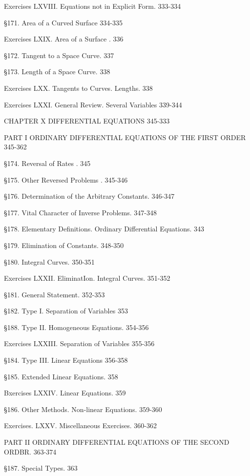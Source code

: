 \documentclass[12pt]{article}
\begin{document}
Exercises LXVIII. Equations not in Explicit Form. 333-334

\S 171. Area of a Curved Surface 334-335

Exercises LXIX. Area of a Surface . 336

\S 172. Tangent to a Space Curve. 337

\S 173. Length of a Space Curve. 338

Exercises LXX. Tangents to Curves. Lengths. 338

Exercises LXXI. General Review. Several Variables 339-344

CHAPTER X DIFFERENTIAL EQUATIONS 345-333
\begin{center}
PART I ORDINARY DIFFERENTIAL EQUATIONS OF
THE FIRST ORDER 345-362
\end{center}

\S 174. Reversal of Rates . 345

\S 175. Other Reversed Problems . 345-346

\S 176. Determination of the Arbitrary Constants. 346-347

\S 177. Vital Character of Inverse Problems. 347-348

\S 178. Elementary Definitions. Ordinary Differential Equations. 343

\S 179. Elimination of Constants. 348-350

\S 180. Integral Curves. 350-351

Exercises LXXII. EliminatIon. Integral Curves. 351-352

\S 181. General Statement. 352-353

\S 182. Type I. Separation of Variables 353

\S 188. Type II. Homogeneous Equations. 354-356

Exercises LXXIII. Separation of Variables 355-356

\S 184. Type III. Linear Equations 356-358

\S 185. Extended Linear Equations. 358

Bxercises LXXIV. Linear Equations. 359

\S 186. Other Methods. Non-linear Equations. 359-360

Exercises. LXXV. Miscellaneous Exercises.  360-362

\begin{center}
PART II ORDINARY DIFFERENTIAL EQUATIONS OF
THE SECOND ORDBR. 363-374
\end{center}

\S 187. Special Types. 363
\end{document}
